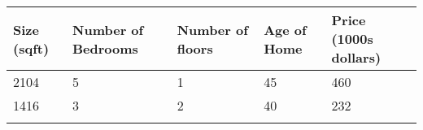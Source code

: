\documentclass[11pt]{article}
\begin{document}
\begin{longtable}[]{@{}lllll@{}}
\toprule
\begin{minipage}[b]{0.17\columnwidth}\raggedright
Size (sqft)\strut
\end{minipage} & \begin{minipage}[b]{0.20\columnwidth}\raggedright
Number of Bedrooms\strut
\end{minipage} & \begin{minipage}[b]{0.18\columnwidth}\raggedright
Number of floors\strut
\end{minipage} & \begin{minipage}[b]{0.15\columnwidth}\raggedright
Age of Home\strut
\end{minipage} & \begin{minipage}[b]{0.15\columnwidth}\raggedright
Price (1000s dollars)\strut
\end{minipage}\tabularnewline
\midrule
\endhead
\begin{minipage}[t]{0.17\columnwidth}\raggedright
2104\strut
\end{minipage} & \begin{minipage}[t]{0.20\columnwidth}\raggedright
5\strut
\end{minipage} & \begin{minipage}[t]{0.18\columnwidth}\raggedright
1\strut
\end{minipage} & \begin{minipage}[t]{0.15\columnwidth}\raggedright
45\strut
\end{minipage} & \begin{minipage}[t]{0.15\columnwidth}\raggedright
460\strut
\end{minipage}\tabularnewline
\begin{minipage}[t]{0.17\columnwidth}\raggedright
1416\strut
\end{minipage} & \begin{minipage}[t]{0.20\columnwidth}\raggedright
3\strut
\end{minipage} & \begin{minipage}[t]{0.18\columnwidth}\raggedright
2\strut
\end{minipage} & \begin{minipage}[t]{0.15\columnwidth}\raggedright
40\strut
\end{minipage} & \begin{minipage}[t]{0.15\columnwidth}\raggedright
232\strut
\end{minipage}\tabularnewline
\begin{minipage}[t]{0.17\columnwidth}\raggedright

\end{minipage}
\end{longtable}
\end{document}
